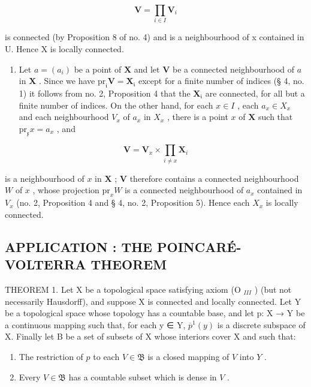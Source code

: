 \[
\mathbf {V} = \prod_ {i \in I} \mathbf {V} _ {i}
\]

is connected (by Proposition 8 of no. 4) and is a neighbourhood of x contained in U. Hence X is locally connected.

\begin{enumerate}
\def\labelenumi{\alph{enumi})}
\setcounter{enumi}{1}
\tightlist
\item
  Let \(a = (a_{i})\) be a point of \(\mathbf{X}\) and let \(\mathbf{V}\) be a connected neighbourhood of \(a\) in \(\mathbf{X}\) . Since we have \(\mathrm{pr}_{\mathfrak{i}}\mathbf{V} = \mathbf{X}_{\mathfrak{i}}\) except for a finite number of indices (§ 4, no. 1) it follows from no. 2, Proposition 4 that the \(\mathbf{X}_{\mathfrak{i}}\) are connected, for all but a finite number of indices. On the other hand, for each \(x \in I\) , each \(a_{x} \in X_{x}\) and each neighbourhood \(V_{x}\) of \(a_{x}\) in \(X_{x}\) , there is a point \(x\) of \(\mathbf{X}\) such that \(\mathrm{pr}_{\mathfrak{x}}x = a_{x}\) , and
\end{enumerate}

\[
\mathbf {V} = \mathbf {V} _ {x} \times \prod_ {i \neq x} \mathbf {X} _ {i}
\]

is a neighbourhood of \(x\) in \(\mathbf{X}\) ; \(\mathbf{V}\) therefore contains a connected neighbourhood \(W\) of \(x\) , whose projection \(\mathrm{pr}_xW\) is a connected neighbourhood of \(a_x\) contained in \(V_x\) (no. 2, Proposition 4 and § 4, no. 2, Proposition 5). Hence each \(X_x\) is locally connected.

\subsection{APPLICATION : THE POINCARÉ-VOLTERRA THEOREM}

THEOREM 1. Let X be a topological space satisfying axiom (O \(_{III}\) ) (but not necessarily Hausdorff), and suppose X is connected and locally connected. Let Y be a topological space whose topology has a countable base, and let p: X → Y be a continuous mapping such that, for each y ∈ Y, \(\overline{p}^{1}(y)\) is a discrete subspace of X. Finally let B be a set of subsets of X whose interiors cover X and such that:

\begin{enumerate}
\def\labelenumi{(\roman{enumi})}
\tightlist
\item
  The restriction of \(p\) to each \(V \in \mathfrak{B}\) is a closed mapping of \(V\) into \(Y\) .\\
\item
  Every \(V \in \mathfrak{B}\) has a countable subset which is dense in \(V\) .
\end{enumerate}

